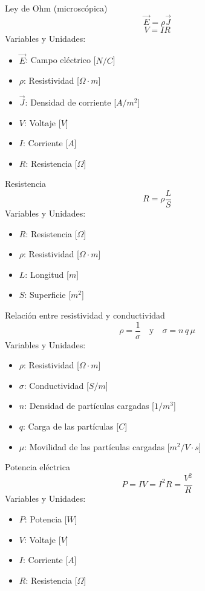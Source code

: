 \begin{landscape}
\begin{multicols}{3}
\begin{teorema}{Ley de Ohm (microscópica)}
    $$\vec{E} = \rho \vec{J}$$
    $$V = IR$$
    Variables y Unidades:
    \begin{itemize}
        \item $\vec{E}$: Campo eléctrico [$N/C$]
        \item $\rho$: Resistividad [$\Omega \cdot m$]
        \item $\vec{J}$: Densidad de corriente [$A/m^2$]
        \item $V$: Voltaje [$V$]
        \item $I$: Corriente [$A$]
        \item $R$: Resistencia [$\Omega$]
    \end{itemize}
\end{teorema}

\begin{teorema}{Resistencia}
    $$R = \rho \frac{L}{S}$$
    Variables y Unidades:
    \begin{itemize}
        \item $R$: Resistencia [$\Omega$]
        \item $\rho$: Resistividad [$\Omega \cdot m$]
        \item $L$: Longitud [$m$]
        \item $S$: Superficie [$m^2$]
    \end{itemize}
\end{teorema}

\begin{teorema}{Relación entre resistividad y conductividad}
    $$\rho = \frac{1}{\sigma} \quad \text{y} \quad \sigma = n \, q \, \mu$$
    Variables y Unidades:
    \begin{itemize}
        \item $\rho$: Resistividad [$\Omega \cdot m$]
        \item $\sigma$: Conductividad [$S/m$]
        \item $n$: Densidad de partículas cargadas [$1/m^3$]
        \item $q$: Carga de las partículas [$C$]
        \item $\mu$: Movilidad de las partículas cargadas [$m^2/V \cdot s$]
    \end{itemize}
\end{teorema}

\begin{teorema}{Potencia eléctrica}
    $$P = I V = I^2 R = \frac{V^2}{R}$$
    Variables y Unidades:
    \begin{itemize}
        \item $P$: Potencia [$W$]
        \item $V$: Voltaje [$V$]
        \item $I$: Corriente [$A$]
        \item $R$: Resistencia [$\Omega$]
    \end{itemize}
\end{teorema}


\end{multicols}
\end{landscape}
